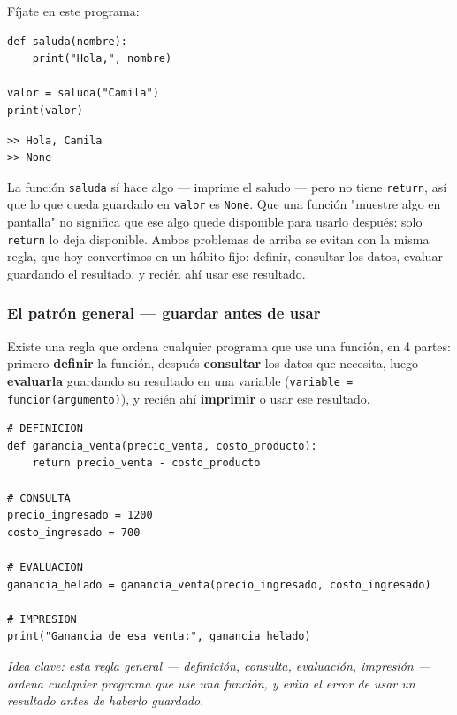 \documentclass[11pt]{article}
\begin{document}
Fíjate en este programa:

\begin{cajacodigo}
\begin{Verbatim}[fontsize=\small]
def saluda(nombre):
    print("Hola,", nombre)

valor = saluda("Camila")
print(valor)
\end{Verbatim}
\end{cajacodigo}
\begin{cajacodigo}
\begin{Verbatim}[fontsize=\small]
>> Hola, Camila
>> None
\end{Verbatim}
\end{cajacodigo}

La función \texttt{saluda} sí hace algo --- imprime el saludo --- pero no tiene \texttt{return}, así que lo que queda guardado en \texttt{valor} es \texttt{None}. Que una función "muestre algo en pantalla" no significa que ese algo quede disponible para usarlo después: solo \texttt{return} lo deja disponible. Ambos problemas de arriba se evitan con la misma regla, que hoy convertimos en un hábito fijo: definir, consultar los datos, evaluar guardando el resultado, y recién ahí usar ese resultado.

\subsubsection*{El patrón general --- guardar antes de usar}
Existe una regla que ordena cualquier programa que use una función, en 4 partes: primero \textbf{definir} la función, después \textbf{consultar} los datos que necesita, luego \textbf{evaluarla} guardando su resultado en una variable (\texttt{variable = funcion(argumento)}), y recién ahí \textbf{imprimir} o usar ese resultado.

\begin{cajacodigo}
\begin{Verbatim}[fontsize=\small]
# DEFINICION
def ganancia_venta(precio_venta, costo_producto):
    return precio_venta - costo_producto

# CONSULTA
precio_ingresado = 1200
costo_ingresado = 700

# EVALUACION
ganancia_helado = ganancia_venta(precio_ingresado, costo_ingresado)

# IMPRESION
print("Ganancia de esa venta:", ganancia_helado)
\end{Verbatim}
\end{cajacodigo}
\textit{Idea clave: esta regla general --- definición, consulta, evaluación, impresión --- ordena cualquier programa que use una función, y evita el error de usar un resultado antes de haberlo guardado.}
\end{document}
